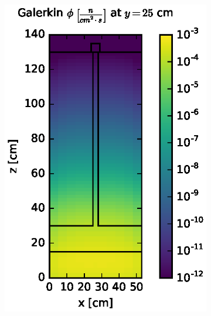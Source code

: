 \documentclass{article} %
\begin{document}
\begin{figure}[!htb]
\begin{subfigure}{0.4\textwidth}
\includegraphics[max height=0.445\textheight]
{steel-fwd-flux-gkn04.eps}
\end{subfigure}
\\
\begin{subfigure}{0.4\textwidth}

\end{subfigure}
\end{figure}
\end{document}
